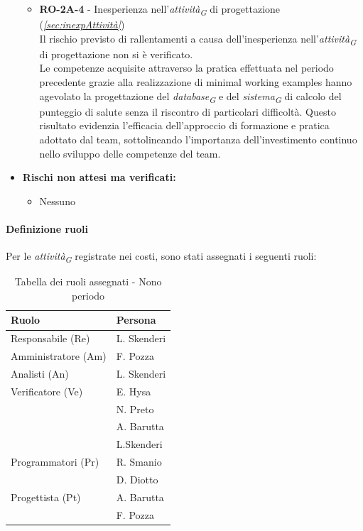 \begin{itemize}
    \begin{itemize}
        \item \textbf{RO-2A-4} - Inesperienza nell'\textit{attività}\textsubscript{\textit{G}} di progettazione (\textit{\ref{sec:inexpAttività}}) \\
        Il rischio previsto di rallentamenti a causa dell'inesperienza nell'\textit{attività}\textsubscript{\textit{G}} di progettazione non si è verificato. \\
        Le competenze acquisite attraverso la pratica effettuata nel periodo precedente grazie alla realizzazione di minimal working examples hanno agevolato la progettazione del \textit{database}\textsubscript{\textit{G}} e del \textit{sistema}\textsubscript{\textit{G}} di calcolo del punteggio di salute senza il riscontro di particolari difficoltà. Questo risultato evidenzia l'efficacia dell'approccio di formazione e pratica adottato dal team, sottolineando l'importanza dell'investimento continuo nello sviluppo delle competenze del team.
    \end{itemize} 
\item \textbf{Rischi non attesi ma verificati:}
    \begin{itemize}
        \item Nessuno
    \end{itemize}
\end{itemize}


\paragraph{Definizione ruoli}
Per le \textit{attività}\textsubscript{\textit{G}} registrate nei costi, sono stati assegnati i seguenti ruoli: 

\begin{table}[H]
    \centering
    \begin{tabular}{|L{4cm}|L{2cm}|}
        \hline
        \textbf{Ruolo} & \textbf{Persona} \\
        \hline
        \hline
        Responsabile (Re)   & L. Skenderi \\
        \hline
        Amministratore (Am) & F. Pozza \\
        \hline
        Analisti (An)       & L. Skenderi \\
        \hline
        Verificatore (Ve)   & E. Hysa \\
                            & N. Preto \\
                            & A. Barutta \\
                            & L.Skenderi \\   
        \hline
        Programmatori (Pr)  & R. Smanio \\
                            & D. Diotto \\
        \hline
        Progettista (Pt)    & A. Barutta \\
                            & F. Pozza \\
        \hline
    \end{tabular}
    \caption{Tabella dei ruoli assegnati - Nono periodo}
    \label{tab:Ruoli_persone_9}
\end{table}

